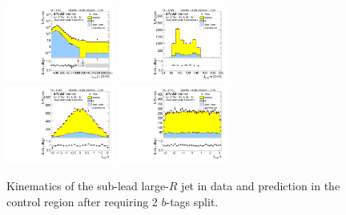 \begin{figure}[htbp!]
\begin{center}
\includegraphics[width=0.32\textwidth,angle=-90]{figures/boosted/Control/b77_TwoTag_split_Control_sublHCand_Pt_m_1.pdf}
\includegraphics[width=0.32\textwidth,angle=-90]{figures/boosted/Control/b77_TwoTag_split_Control_sublHCand_Mass_s.pdf}\\
\includegraphics[width=0.32\textwidth,angle=-90]{figures/boosted/Control/b77_TwoTag_split_Control_sublHCand_Eta.pdf}
\includegraphics[width=0.32\textwidth,angle=-90]{figures/boosted/Control/b77_TwoTag_split_Control_sublHCand_Phi.pdf}
  \caption{Kinematics of the sub-lead large-$R$ jet in data and prediction in the control region after requiring 2 $b$-tags split. }
  \label{fig:boosted-2bs-control-ak10-subl}
\end{center}
\end{figure}

